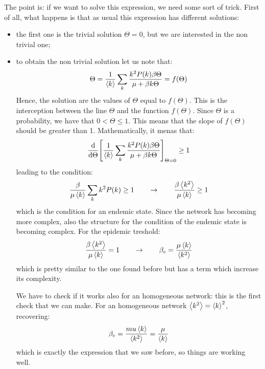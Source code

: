 \documentclass[../main/main.tex]{subfiles}
\begin{document}
The point is: if we want to solve this expression, we need some sort of trick. First of all, what happens is that as usual this expression has different solutions:
\begin{itemize}
\item the first one is the trivial solution \( \Theta =0 \), but we are interested in the non trivial one;
\item to obtain the non trivial solution let us note that:
\begin{equation*}
   \Theta = \frac{1}{\expval{k} } \sum_{k}^{} \frac{k^2 P(k) \beta \Theta }{\mu + \beta k \Theta } = f(\Theta )
\end{equation*}
Hence, the solution are the values of \( \Theta  \) equal to \( f(\Theta ) \). This is the interception between the line \( \Theta  \) and the function \( f(\Theta ) \). Since \( \Theta  \) is a probability, we have that \( 0<\Theta \le 1 \). This means that the slope of \( f(\Theta ) \) should be greater than 1.
Mathematically, it menas that:
\begin{equation*}
  \dv{}{\Theta }  \qty[ \frac{1}{\expval{k} } \sum_{k}^{} \frac{k^2 P(k) \beta \Theta }{\mu + \beta k \Theta } ]_{\Theta =0} \ge 1
\end{equation*}
leading to the condition:
\begin{equation}
\frac{\beta }{\mu \expval{k} } \sum_{k}^{}k^2 P(k) \ge 1 \qquad \rightarrow  \qquad \frac{\beta \expval{k^2} }{\mu \expval{k} } \ge 1
\end{equation}
which is the condition for an endemic state. Since the network has becoming more complex, also the structure for the condition of the endemic state is becoming complex. For the epidemic treshold:
\begin{equation}
 \frac{\beta \expval{k^2} }{\mu \expval{k} } = 1 \qquad \rightarrow \qquad \beta _c = \frac{\mu \expval{k} }{\expval{k^2} }
\end{equation}
which is pretty similar to the one found before but has a term which increase its complexity.

We have to check if it works also for an homogeneous network: this is the first check that we can make. For an homogeneous network \( \expval{k^2} = \expval{k}^2   \), recovering:
\begin{equation*}
  \beta _c = \frac{mu \expval{k} }{\expval{k^2} } = \frac{\mu }{\expval{k} }
\end{equation*}
which is exactly the expression that we saw before, so things are working well.

\end{itemize}
\end{document}
